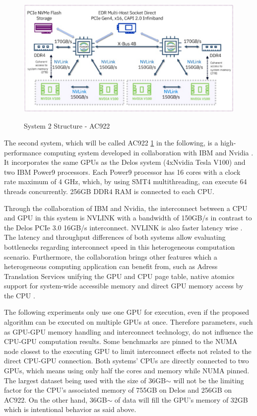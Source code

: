 \begin{figure}[h]
  \caption{System 2 Structure - AC922 \cite{ganesannarayanasamyPowerAIDeepDive12:39:24UTC}}
  \includegraphics[width=\textwidth]{figures/ac922_system_arch.png}
  \centering
  \label{fig:ac922_arch}
\end{figure}

The second system, which will be called AC922 \ref{fig:ac922_arch} in the following, is a high-performance computing system developed in collaboration with IBM and Nvidia \cite{caldeiraIBMPowerSystem}. It incorporates the same GPUs as the Delos system (4xNvidia Tesla V100) and two IBM Power9 processors. Each Power9 processor has 16 cores with a clock rate maximum of 4 GHz, which, by using SMT4 multithreading, can execute 64 threads concurrently. 256GB DDR4 RAM is connected to each CPU.

Through the collaboration of IBM and Nvidia, the interconnect between a CPU and GPU in this system is NVLINK \cite{NVLink2021, zargesEvaluationOnNodeGPU} with a bandwidth of 150GB/s in contrast to the Delos PCIe 3.0 16GB/s interconnect. NVLINK is also faster latency wise \cite{liEvaluatingModernGPU2020}. The latency and throughput differences of both systems allow evaluating bottlenecks regarding interconnect speed in this heterogeneous computation scenario.
Furthermore, the collaboration brings other features which a heterogeneous computing application can benefit from, such as Adress Translation Services \cite{ibmpower9nputeamFunctionalityPerformanceNVLink2018} unifying the GPU and CPU page table, native atomics support for system-wide accessible memory and direct GPU memory access by the CPU \cite{UNIFIEDMEMORYP9}.

The following experiments only use one GPU for execution, even if the proposed algorithm can be executed on multiple GPUs at once. Therefore parameters, such as GPU-GPU memory handling and interconnect technology, do not influence the CPU-GPU computation results. Some benchmarks are pinned to the NUMA node closest to the executing GPU to limit interconnect effects not related to the direct CPU-GPU connection. Both systems' CPUs are directly connected to two GPUs, which means using only half the cores and memory while NUMA pinned. The largest dataset being used with the size of 36GB$\sim$ will not be the limiting factor for the CPU's associated memory of 755GB on Delos and 256GB on AC922. On the other hand, 36GB$\sim$ of data will fill the GPU's memory of 32GB which is intentional behavior as said above.

